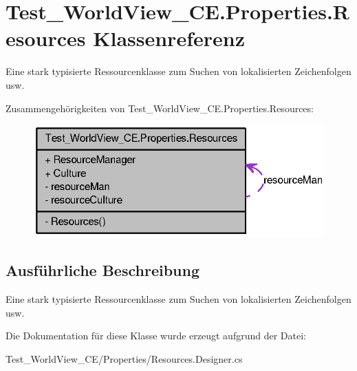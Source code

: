 \hypertarget{class_test___world_view___c_e_1_1_properties_1_1_resources}{
\section{Test\_\-WorldView\_\-CE.Properties.Resources Klassenreferenz}
\label{class_test___world_view___c_e_1_1_properties_1_1_resources}
}


Eine stark typisierte Ressourcenklasse zum Suchen von lokalisierten Zeichenfolgen usw.  




Zusammengehörigkeiten von Test\_\-WorldView\_\-CE.Properties.Resources:\nopagebreak
\begin{figure}[H]
\begin{center}
\leavevmode
\includegraphics[width=321pt]{class_test___world_view___c_e_1_1_properties_1_1_resources__coll__graph}
\end{center}
\end{figure}


\subsection{Ausführliche Beschreibung}
Eine stark typisierte Ressourcenklasse zum Suchen von lokalisierten Zeichenfolgen usw. 

Die Dokumentation für diese Klasse wurde erzeugt aufgrund der Datei:\begin{DoxyCompactItemize}
\item 
Test\_\-WorldView\_\-CE/Properties/Resources.Designer.cs\end{DoxyCompactItemize}
